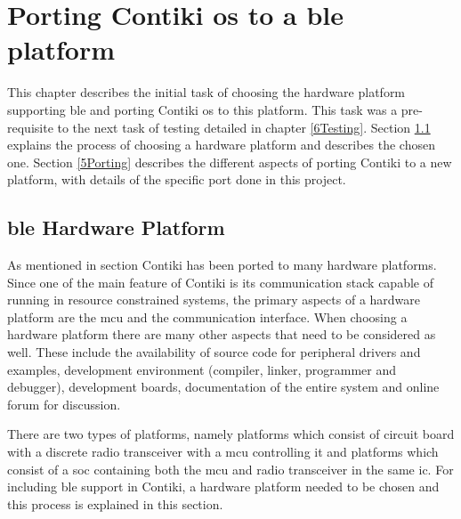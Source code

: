 \chapter{Porting Contiki \gls{os} to a \gls{ble} platform} \label{5bleContiki}

This chapter describes the initial task of choosing the hardware platform supporting \gls{ble} and porting Contiki \gls{os} to this platform. This task was a pre-requisite to the next task of testing detailed in chapter \ref{6Testing}. Section \ref{5HwPlt} explains the process of choosing a hardware platform and describes the chosen one. Section \ref{5Porting} describes the different aspects of porting Contiki to a new platform, with details of the specific port done in this project.

\section{\gls{ble} Hardware Platform} \label{5HwPlt}

As mentioned in section  Contiki has been ported to many hardware platforms. Since one of the main feature of Contiki is its communication stack capable of running in resource constrained systems, the primary aspects of a hardware platform are the \gls{mcu} and the communication interface. When choosing a hardware platform there are many other aspects that need to be considered as well. These include the availability of source code for peripheral drivers and examples, development environment (compiler, linker, programmer and debugger), development boards, documentation of the entire system and online forum for discussion.

There are two types of platforms, namely platforms which consist of circuit board with a discrete radio transceiver with a \gls{mcu} controlling it and platforms which consist of a \gls{soc} containing both the \gls{mcu} and radio transceiver in the same \gls{ic}. For including \gls{ble} support in Contiki, a hardware platform needed to be chosen and this process is explained in this section.

